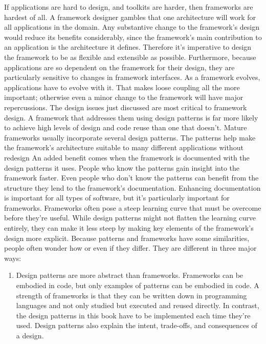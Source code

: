 \documentclass{report}
\begin{document}
\begin{itemize}
            \bigbreak \noindent 
            If applications are hard to design, and toolkits are harder, then frameworks are hardest of all. A framework designer gambles that one architecture will work for all applications in the domain. Any substantive change to the framework's design would reduce its benefits considerably, since the framework's main contribution to an application is the architecture it defines. Therefore it's imperative to design the framework to be as flexible and extensible as possible.
            \bigbreak \noindent 
            Furthermore, because applications are so dependent on the framework for their design, they are particularly sensitive to changes in framework interfaces. As a framework evolves, applications have to evolve with it. That makes loose coupling all the more important; otherwise even a minor change to the framework will have major repercussions.
            \bigbreak \noindent 
            The design issues just discussed are most critical to framework design. A framework that addresses them using design patterns is far more likely to achieve high levels of design and code reuse than one that doesn't. Mature frameworks usually incorporate several design patterns. The patterns help make the framework's architecture suitable to many different applications without redesign
            \bigbreak \noindent 
            An added benefit comes when the framework is documented with the design patterns it uses. People who know the patterns gain insight into the framework faster. Even people who don't know the patterns can benefit from the structure they lend to the framework's documentation. Enhancing documentation is important for all types of software, but it's particularly important for frameworks. Frameworks often pose a steep learning curve that must be overcome before they're useful. While design patterns might not flatten the learning curve entirely, they can make it less steep by making key elements of the framework's design more explicit.
            \bigbreak \noindent 
            Because patterns and frameworks have some similarities, people often wonder how or even if they differ. They are different in three major ways:
            \begin{enumerate}
                \item Design patterns are more abstract than frameworks. Frameworks can be embodied in code, but only examples of patterns can be embodied in code. A strength of frameworks is that they can be written down in programming languages and not only studied but executed and reused directly. In contrast, the design patterns in this book have to be implemented each time they're used. Design patterns also explain the intent, trade-offs, and consequences of a design.

\end{enumerate}
\end{itemize}
\end{document}
